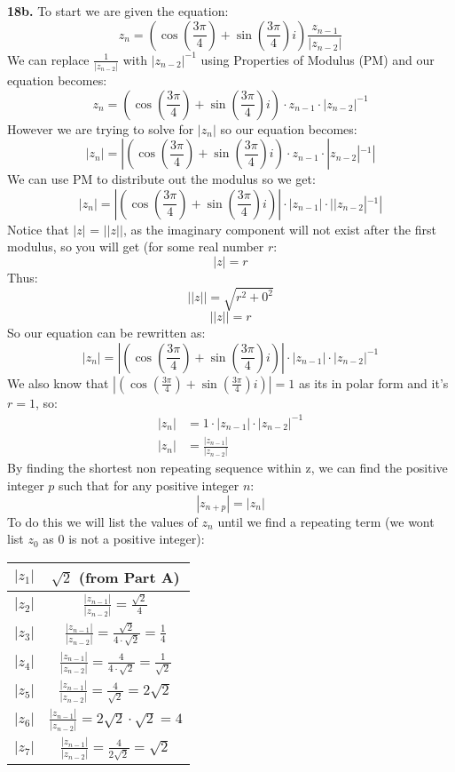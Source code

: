 \documentclass[11pt]{article}
\begin{document}
\textbf{18b.} To start we are given the equation:
\[ z_n = (\cos(\frac{3\pi}{4}) + \sin(\frac{3\pi}{4})i)\frac{z_{n-1}}{|z_{n-2}|} \]
We can replace $\frac{1}{|z_{n-2}|}$ with $|z_{n-2}|^{-1}$ using Properties of Modulus (PM) and our equation becomes:
\[ z_n = (\cos(\frac{3\pi}{4}) + \sin(\frac{3\pi}{4})i) \cdot z_{n-1} \cdot |z_{n-2}|^{-1} \]
However we are trying to solve for $|z_n|$ so our equation becomes:
\[ |z_n| = |(\cos(\frac{3\pi}{4}) + \sin(\frac{3\pi}{4})i) \cdot z_{n-1} \cdot |z_{n-2}|^{-1}| \]
We can use PM to distribute out the modulus so we get:
\[ |z_n| = |(\cos(\frac{3\pi}{4}) + \sin(\frac{3\pi}{4})i)| \cdot |z_{n-1}| \cdot | |z_{n-2}|^{-1}| \]
Notice that $|z|$ = $||z||$, as the imaginary component will not exist after the first modulus, so you will get (for some real number $r$:
\[ |z| = r \]
Thus:
\[ ||z|| = \sqrt{r^2 + 0^2} \]
\[ ||z|| = r \]
So our equation can be rewritten as:
\[ |z_n| = |(\cos(\frac{3\pi}{4}) + \sin(\frac{3\pi}{4})i)| \cdot |z_{n-1}| \cdot |z_{n-2}|^{-1} \]
We also know that $|(\cos(\frac{3\pi}{4}) + \sin(\frac{3\pi}{4})i)| = 1$ as its in polar form and it's $r = 1$, so:
\begin{align*}
 |z_n| &= 1 \cdot |z_{n-1}| \cdot |z_{n-2}|^{-1}  \\
|z_n| &= \frac {|z_{n-1}|}{|z_{n-2}|}  
\end{align*}
By finding the shortest non repeating sequence within z, we can find the positive integer $p$ such that for any positive integer $n$:
\[ |z_{n+p}| = |z_n| \]
To do this we will list the values of $z_n$ until we find a repeating term (we wont list $z_0$ as 0 is not a positive integer):
\begin{center}
 \begin{tabular}{||c | c||} 
\hline
 $|z_1|$ &  $\sqrt2$ (from Part A) \\ 
 \hline
 $|z_2|$ & $ \frac {|z_{n-1}|}{|z_{n-2}|} = \frac {\sqrt2}{4}$\\ 
 \hline
 $|z_3|$ & $ \frac {|z_{n-1}|}{|z_{n-2}|} = \frac {\sqrt2}{4\cdot\sqrt2} =  \frac {1}{4}$\\ 
 \hline
 $|z_4|$ & $ \frac {|z_{n-1}|}{|z_{n-2}|} = \frac {4}{4\cdot\sqrt2} =  \frac {1}{\sqrt2}$\\ 
 \hline
 $|z_5|$ & $ \frac {|z_{n-1}|}{|z_{n-2}|} = \frac {4}{\sqrt2} =  2\sqrt2$\\ 
 \hline
 $|z_6|$ & $ \frac {|z_{n-1}|}{|z_{n-2}|} = 2\sqrt2\cdot\sqrt2 =  4$\\ 
 \hline
 $|z_7|$ & $ \frac {|z_{n-1}|}{|z_{n-2}|} = \frac {4}{2\sqrt2} =  \sqrt2$\\ 
 \hline
\end{tabular}
\end{center}
\end{document}
